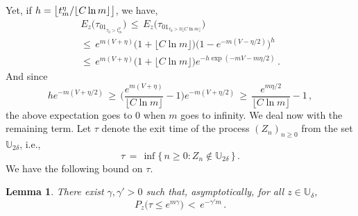 \documentclass[a4paper,12pt]{article}
\newtheorem{lemma}[theorem]{Lemma}
\theoremstyle{definition}
\theoremstyle{remark}
\def \g {\gamma}
\def \d {\delta}
\def \dU {\mathbb{U}}
\begin{document}
Yet, if $h=\smash{\big\lfloor t^\eta_m/\lfloor C\ln m\rfloor\big\rfloor}$,
we have,
\begin{multline*}
E_z\big(
\tau_01_{\tau_0>t^\eta_m}
\big)\,\leq\,E_z\big(
\tau_01_{\tau_0>h\lfloor C\ln m\rfloor}
\big)\\
\leq\,e^{m(V+\eta)}\big(
1+\lfloor C\ln m\rfloor 
\big)\Big(
1-e^{-m(V-\eta/2)}
\Big)^h\\
\leq\,e^{m(V+\eta)}\big(
1+\lfloor C\ln m\rfloor
\big)e^{-h\exp(-mV-m\eta/2)}\,.
\end{multline*}
And since
$$he^{-m(V+\eta/2)}\,\geq\,
\bigg(
\frac{e^{m(V+\eta)}}{\lfloor C\ln m\rfloor}-1
\bigg)e^{-m(V+\eta/2)}\,\geq\,
\frac{e^{m\eta/2}}{\lfloor C\ln m\rfloor}-1\,,$$
the above expectation goes to $0$ when $m$ goes to infinity.
We deal now with the remaining term.
Let $\tau$ denote the exit time of the process $(Z_n)_{n\geq 0}$
from the set $\dU_{2\d}$, i.e.,
$$\tau\,=\,\inf\big\lbrace\,
n\geq 0: Z_n\not\in\dU_{2\d}
\,\big\rbrace\,.$$
We have the following bound on $\tau$.
\begin{lemma}
There exist $\g,\g'>0$ such that, asymptotically,
for all $z\in\dU_\d$,
$$P_z\big(
\tau\leq e^{m \g}
\big)\,<\,e^{-\g' m}\,.$$
\end{lemma}
\end{document}
